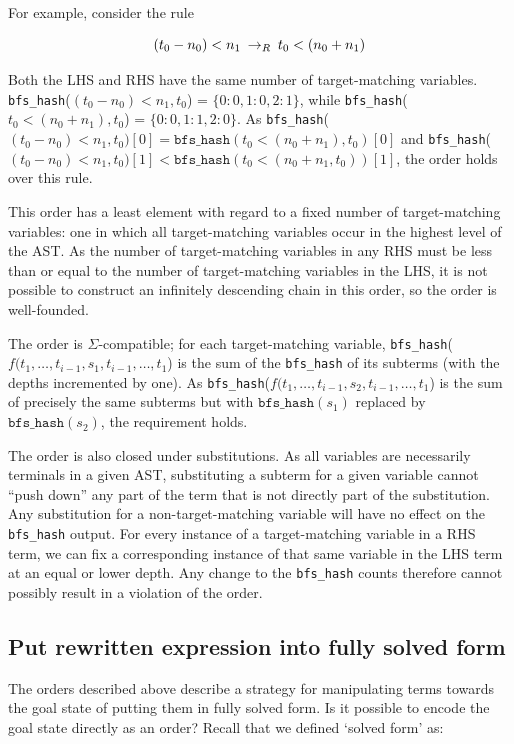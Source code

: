 For example, consider the rule

\[ (t_0 - n_0) < n_1 \:\rightarrow_{R}\: t_0 < (n_0 + n_1)
\]

Both the LHS and RHS have the same number of target-matching variables. \texttt{bfs_hash}($(t_0 - n_0) < n_1, t_0$) = $\{0: 0, 1: 0, 2:1\}$, while \texttt{bfs_hash}($t_0 < (n_0 + n_1), t_0$) = $\{0: 0, 1: 1, 2:0\}$. As \texttt{bfs_hash}($(t_0 - n_0) < n_1, t_0)[0] = \texttt{bfs_hash}(t_0 < (n_0 + n_1), t_0)[0]$ and \texttt{bfs_hash}($(t_0 - n_0) < n_1, t_0)[1] < \texttt{bfs_hash}(t_0 < (n_0 + n_1, t_0))[1]$, the order holds over this rule.

This order has a least element with regard to a fixed number of target-matching variables: one in which all target-matching variables occur in the highest level of the AST. As the number of target-matching variables in any RHS must be less than or equal to the number of target-matching variables in the LHS, it is not possible to construct an infinitely descending chain in this order, so the order is well-founded.

The order is $\Sigma$-compatible; for each target-matching variable, \texttt{bfs_hash}($f(t_1,\dots,t_{i-1},s_1,t_{i-1},\dots,t_1$) is the sum of the \texttt{bfs_hash} of its subterms (with the depths incremented by one). As \texttt{bfs_hash}($f(t_1,\dots,t_{i-1},s_2,t_{i-1},\dots,t_1$) is the sum of precisely the same subterms but with $\texttt{bfs_hash}(s_1)$ replaced by $\texttt{bfs_hash}(s_2)$, the requirement holds.

The order is also closed under substitutions. As all variables are necessarily terminals in a given AST, substituting a subterm for a given variable cannot ``push down'' any part of the term that is not directly part of the substitution. Any substitution for a non-target-matching variable will have no effect on the \texttt{bfs_hash} output. For every instance of a target-matching variable in a RHS term, we can fix a corresponding instance of that same variable in the LHS term at an equal or lower depth. Any change to the \texttt{bfs_hash} counts therefore cannot possibly result in a violation of the order.

\subsection{Put rewritten expression into fully solved form}

The orders described above describe a strategy for manipulating terms towards the goal state of putting them in fully solved form. Is it possible to encode the goal state directly as an order? Recall that we defined `solved form' as:

